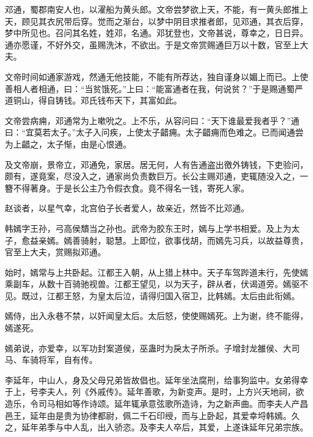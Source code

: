 \documentclass[12pt,UTF8]{ctexbook}
\begin{document}
邓通，蜀郡南安人也，以濯船为黄头郎。文帝尝梦欲上天，不能，有一黄头郎推上天，顾见其衣尻带后穿。觉而之渐台，以梦中阴目求推者郎，见邓通，其衣后穿，梦中所见也。召问其名姓，姓邓，名通。邓犹登也，文帝甚说，尊幸之，日日异。通亦愿谨，不好外交，虽赐洗沐，不欲出。于是文帝赏赐通巨万以十数，官至上大夫。



文帝时间如通家游戏，然通无他技能，不能有所荐达，独自谨身以媚上而已。上使善相人者相通，曰：“当贫饿死。”上曰：“能富通者在我，何说贫？”于是赐通蜀严道铜山，得自铸钱。邓氏钱布天下，其富如此。



文帝尝病痈，邓通常为上嗽吮之。上不乐，从容问曰：“天下谁最爱我者乎？”通曰：“宜莫若太子。”太子入问疾，上使太子齰痈。太子齰痈而色难之。已而闻通尝为上齰之，太子惭，由是心恨通。



及文帝崩，景帝立，邓通免，家居。居无何，人有告通盗出徼外铸钱，下吏验问，颇有，遂竟案，尽没入之，通家尚负责数巨万。长公主赐邓通，吏辄随没入之，一簪不得著身。于是长公主乃令假衣食。竟不得名一钱，寄死人家。



赵谈者，以星气幸，北宫伯子长者爱人，故亲近，然皆不比邓通。



韩嫣字王孙，弓高侯穨当之孙也。武帝为胶东王时，嫣与上学书相爱。及上为太子，愈益亲嫣。嫣善骑射，聪慧。上即位，欲事伐胡，而嫣先习兵，以故益尊贵，官至上大夫，赏赐拟邓通。



始时，嫣常与上共卧起。江都王入朝，从上猎上林中。天子车驾跸道未行，先使嫣乘副车，从数十百骑驰视兽。江都王望见，以为天子，辟从者，伏谒道旁。嫣驱不见。既过，江都王怒，为皇太后泣，请得归国入宿卫，比韩嫣。太后由此衔嫣。



嫣侍，出入永巷不禁，以奸闻皇太后。太后怒，使使赐嫣死。上为谢，终不能得，嫣遂死。



嫣弟说，亦爱幸，以军功封案道侯，巫蛊时为戾太子所杀。子增封龙雒侯、大司马、车骑将军，自有传。



李延年，中山人，身及父母兄弟皆故倡也。延年坐法腐刑，给事狗监中。女弟得幸于上，号李夫人，列《外戚传》。延年善歌，为新变声。是时，上方兴天地祠，欲造乐，令司马相如等作诗颂。延年辄承意弦歌所造诗，为之新声曲。而李夫人产昌邑王，延年由是贵为协律都尉，佩二千石印绶，而与上卧起，其爱幸埒韩嫣。久之，延年弟季与中人乱，出入骄恣。及李夫人卒后，其爱，上遂诛延年兄弟宗族。
\end{document}
